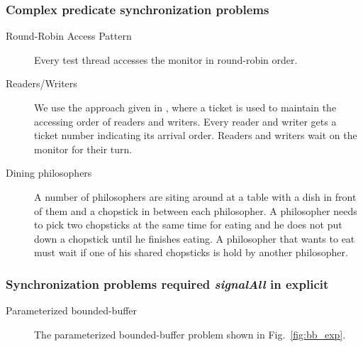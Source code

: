 \documentclass[preprint]{sigplanconf}
\begin{document}
\subsubsection{Complex predicate synchronization problems}
\begin{description}
    \item[Round-Robin Access Pattern] Every test thread accesses the
        monitor in round-robin order. 
    \item[Readers/Writers  \cite{chp71}] 
    We use the approach given in \cite{bh05}, where a ticket is used
        to maintain the accessing order of readers and writers. Every reader
        and writer gets a ticket number indicating its arrival order. Readers
        and writers wait on the monitor for their turn. 
    \item [Dining philosophers \cite{dijk71}] A number of philosophers are 
        siting around at a table with a dish in front of them and a chopstick 
        in between each philosopher. A philosopher needs to pick two chopsticks at the
        same time for eating and he does not put down a chopstick until he finishes 
        eating. A philosopher that wants to eat must wait if one of his shared 
        chopsticks is hold by another philosopher.
\end{description}
\subsubsection{Synchronization problems required {\em signalAll} in explicit }
\begin{description}
    \item[Parameterized bounded-buffer   \cite{dijk65, dijk71}] The 
        parameterized bounded-buffer problem shown in Fig.~\ref{fig:bb_exp}. 
\end{description}
\end{document}
